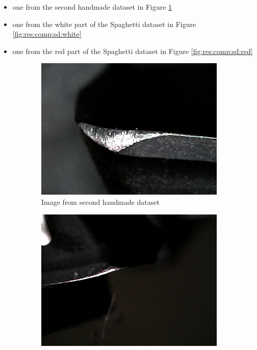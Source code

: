 \begin{itemize}
\item one from the second handmade dataset in Figure \ref{fig:res:comp:shd}
\item one from the white part of the Spaghetti dataset in Figure \ref{fig:res:comp:sd:white}
\item one from the red part of the Spaghetti dataset in Figure \ref{fig:res:comp:sd:red}
\end{itemize} 

	\begin{figure}[hbtp]
		\centering
		\begin{subfigure}{0.31\textwidth}
			\includegraphics[width=\linewidth]{fig/Vision/Dataset/handmade_datasets/Second_handmade_dataset/b_005_p_010_s.jpg}
			\caption{Image from second handmade dataset}
			\label{fig:res:comp:shd}
		\end{subfigure}
		\hspace*{\fill}
		\begin{subfigure}{0.31\textwidth}
			\centering
			\includegraphics[width=\linewidth]{fig/Vision/Dataset/automated_datasets/2_created_datasets/2_Spaghetti_dataset/b_003_p_006_l_006-011_white_nb.png}

\end{subfigure}
\end{figure}
